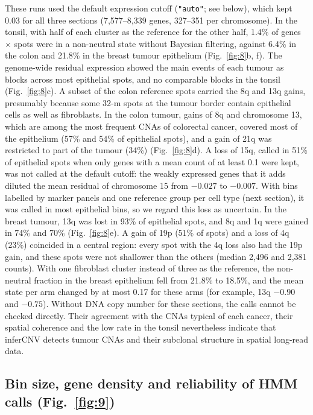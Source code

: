 These runs used the default expression cutoff (\texttt{"auto"}; see below), which kept 0.03 for all three sections (7,577--8,339 genes, 327--351 per chromosome). In the tonsil, with half of each cluster as the reference for the other half, 1.4\% of genes $\times$ spots were in a non-neutral state without Bayesian filtering, against 6.4\% in the colon and 21.8\% in the breast tumour epithelium (Fig.~\ref{fig:8}b, f). The genome-wide residual expression showed the main events of each tumour as blocks across most epithelial spots, and no comparable blocks in the tonsil (Fig.~\ref{fig:8}c). A subset of the colon reference spots carried the 8q and 13q gains, presumably because some 32-\textmu m spots at the tumour border contain epithelial cells as well as fibroblasts. In the colon tumour, gains of 8q and chromosome 13, which are among the most frequent CNAs of colorectal cancer, covered most of the epithelium (57\% and 54\% of epithelial spots), and a gain of 21q was restricted to part of the tumour (34\%) (Fig.~\ref{fig:8}d). A loss of 15q, called in 51\% of epithelial spots when only genes with a mean count of at least 0.1 were kept, was not called at the default cutoff: the weakly expressed genes that it adds diluted the mean residual of chromosome 15 from $-0.027$ to $-0.007$. With bins labelled by marker panels and one reference group per cell type (next section), it was called in most epithelial bins, so we regard this loss as uncertain. In the breast tumour, 13q was lost in 93\% of epithelial spots, and 8q and 1q were gained in 74\% and 70\% (Fig.~\ref{fig:8}e). A gain of 19p (51\% of spots) and a loss of 4q (23\%) coincided in a central region: every spot with the 4q loss also had the 19p gain, and these spots were not shallower than the others (median 2,496 and 2,381 counts). With one fibroblast cluster instead of three as the reference, the non-neutral fraction in the breast epithelium fell from 21.8\% to 18.5\%, and the mean state per arm changed by at most 0.17 for these arms (for example, 13q $-0.90$ and $-0.75$). Without DNA copy number for these sections, the calls cannot be checked directly. Their agreement with the CNAs typical of each cancer, their spatial coherence and the low rate in the tonsil nevertheless indicate that inferCNV detects tumour CNAs and their subclonal structure in spatial long-read data.


\subsection{Bin size, gene density and reliability of HMM calls (Fig.~\ref{fig:9})}

